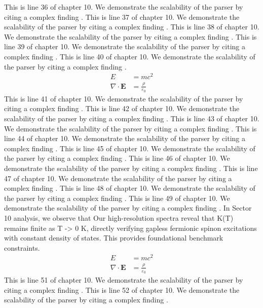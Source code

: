 This is line 36 of chapter 10. We demonstrate the scalability of the parser by citing a complex finding \cite{ref10_36}.
This is line 37 of chapter 10. We demonstrate the scalability of the parser by citing a complex finding \cite{ref10_37}.
This is line 38 of chapter 10. We demonstrate the scalability of the parser by citing a complex finding \cite{ref10_38}.
This is line 39 of chapter 10. We demonstrate the scalability of the parser by citing a complex finding \cite{ref10_39}.
This is line 40 of chapter 10. We demonstrate the scalability of the parser by citing a complex finding \cite{ref10_40}.
\begin{align*}
  E &= mc^2 \\
  \nabla \cdot \mathbf{E} &= \frac{\rho}{\varepsilon_0}
\end{align*}
This is line 41 of chapter 10. We demonstrate the scalability of the parser by citing a complex finding \cite{ref10_41}.
This is line 42 of chapter 10. We demonstrate the scalability of the parser by citing a complex finding \cite{ref10_42}.
This is line 43 of chapter 10. We demonstrate the scalability of the parser by citing a complex finding \cite{ref10_43}.
This is line 44 of chapter 10. We demonstrate the scalability of the parser by citing a complex finding \cite{ref10_44}.
This is line 45 of chapter 10. We demonstrate the scalability of the parser by citing a complex finding \cite{ref10_45}.
This is line 46 of chapter 10. We demonstrate the scalability of the parser by citing a complex finding \cite{ref10_46}.
This is line 47 of chapter 10. We demonstrate the scalability of the parser by citing a complex finding \cite{ref10_47}.
This is line 48 of chapter 10. We demonstrate the scalability of the parser by citing a complex finding \cite{ref10_48}.
This is line 49 of chapter 10. We demonstrate the scalability of the parser by citing a complex finding \cite{ref10_49}.
In Sector 10 analysis, we observe that Our high-resolution spectra reveal that K(T) remains finite as T -> 0 K, directly verifying gapless fermionic spinon excitations with constant density of states. This provides foundational benchmark constraints.
\begin{align*}
  E &= mc^2 \\
  \nabla \cdot \mathbf{E} &= \frac{\rho}{\varepsilon_0}
\end{align*}
This is line 51 of chapter 10. We demonstrate the scalability of the parser by citing a complex finding \cite{ref10_51}.
This is line 52 of chapter 10. We demonstrate the scalability of the parser by citing a complex finding \cite{ref10_52}.
